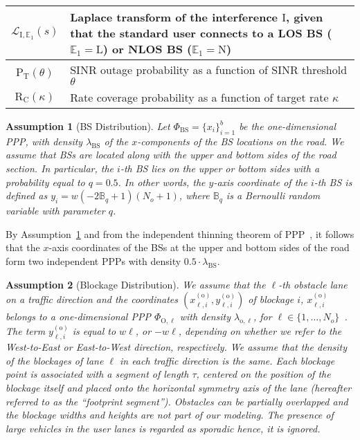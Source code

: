 \documentclass[10pt,journal,a4paper]{IEEEtran}
\newtheorem{assumption}{Assumption}[section]
\begin{document}
\begin{table}[t!]
{\begin{tabular}{|c|p{6.5cm}|}
\hline $\mathcal{L}_\mathrm{I,\mathbb{E}_1}(s)$  & Laplace transform of the interference $\mathrm{I}$, given that the standard user connects to a LOS BS ($\mathbb{E}_1 = \mathrm{L}$) or NLOS BS ($\mathbb{E}_1 = \mathrm{N}$)\\
\hline $\mathrm{P}_\mathrm{T}(\theta)$  & SINR outage probability as a function of SINR threshold $\theta$\\
\hline $\mathrm{R}_\mathrm{C}(\kappa)$  & Rate coverage probability as a function of target rate $\kappa$\\
\hline
\end{tabular}
}\vspace{-4mm}
\end{table}

\begin{assumption}[BS Distribution]\label{ass.BSdist}
Let $\Phi_{\mathrm{BS}} = \{x_i\}_{i = 1}^b$ be the one-dimensional PPP, with density $\lambda_{\mathrm{BS}}$ of the \mbox{$x$-components} of the BS locations on the road. We assume that BSs are located along with the upper and bottom sides of the road section. In particular, the $i$-th BS lies on the upper or bottom sides with a probability equal to $q = 0.5$. In other words, the $y$-axis coordinate of the $i$-th BS is defined as $y_i = w(-2\mathbb{B}_q+1)(N_o + 1)$, where $\mathbb{B}_q$ is a Bernoulli random variable with parameter $q$.
\end{assumption}

By Assumption~\ref{ass.BSdist} and from the independent thinning theorem of PPP~\cite[Theorem 2.36]{haenggi2013stochastic}, it follows that the \mbox{$x$-axis} coordinates of the BSs at the upper and bottom sides of the road form two independent PPPs with density $0.5 \cdot \lambda_{\mathrm{BS}}$.

\begin{assumption}[Blockage Distribution]\label{ass.BlDist}
We assume that the \mbox{$\ell$-th} obstacle lane  on a traffic direction and the coordinates $(x^{\mathrm{(o)}}_{\ell,i}, y^{\mathrm{(o)}}_{\ell,i})$ of blockage $i$, $x^{\mathrm{(o)}}_{\ell,i}$ belongs to a one-dimensional PPP $\Phi_{\mathrm{O},\ell}$ with density $\lambda_{\mathrm{o},\ell}$, for $\ell \in \{1, \ldots, N_o\}$~\cite{RW4}. The term $y^{\mathrm{(o)}}_{\ell,i}$ is equal to $w\ell$, or $-w\ell$, depending on whether we refer to the West-to-East or East-to-West direction, respectively. We assume that the density of the blockages of lane $\ell$ in each traffic direction is the same. Each blockage point is associated with a segment of length $\tau$, centered on the position of the blockage itself and placed onto the horizontal symmetry axis of the lane (hereafter referred to as the ``footprint segment''). Obstacles can be partially overlapped and the blockage widths and heights are not part of our modeling. The presence of large vehicles in the user lanes is regarded as sporadic hence, it is ignored.\label{ass.blockageDistribution}
\end{assumption}
\end{document}
